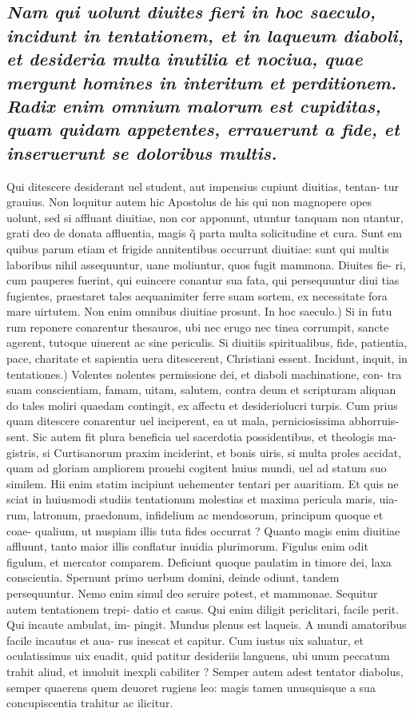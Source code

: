 \documentclass{article}
\begin{document}
\begin{pages}
\subsection*{\textit{Nam qui uolunt diuites fieri in hoc saeculo, incidunt in tentationem, et in laqueum diaboli, et desideria multa inutilia et nociua, quae mergunt homines in interitum et perditionem. Radix enim omnium malorum est cupiditas, quam quidam appetentes, errauerunt a fide, et inseruerunt se doloribus multis. }}\pstart Qui ditescere desiderant uel student, aut impensius cupiunt diuitias, tentan- tur grauius. Non loquitur autem hic Apostolus de his qui non magnopere opes uolunt, sed si affluant diuitiae, non cor apponunt, utuntur tanquam non utantur, grati deo de donata affluentia, magis q̃ parta multa solicitudine et cura. Sunt em quibus parum etiam et frigide annitentibus occurrunt diuitiae: sunt qui multis laboribus nihil assequuntur, uane moliuntur, quos fugit mammona. Diuites fie- ri, cum pauperes fuerint, qui euincere conantur sua fata, qui persequuntur diui tias fugientes, praestaret tales aequanimiter ferre suam sortem, ex necessitate fora mare uirtutem. Non enim omnibus diuitiae prosunt. In hoc saeculo.) Si in futu rum reponere conarentur thesauros, ubi nec erugo nec tinea corrumpit, sancte agerent, tutoque uiuerent ac sine periculis. Si diuitiis spiritualibus, fide, patientia, pace, charitate et sapientia uera ditescerent, Christiani essent. Incidunt, inquit, in tentationes.) Volentes nolentes permissione dei, et diaboli machinatione, con- tra suam conscientiam, famam, uitam, salutem, contra deum et scripturam aliquan do tales moliri quaedam contingit, ex affectu et desideriolucri turpis. Cum prius quam ditescere conarentur uel inciperent, ea ut mala, perniciosissima abhorruis- sent. Sic autem fit plura beneficia uel sacerdotia possidentibus, et theologis ma- gistris, si Curtisanorum praxim inciderint, et bonis uiris, si multa proles accidat, quam ad gloriam ampliorem prouehi cogitent huius mundi, uel ad statum suo similem. Hii enim statim incipiunt uehementer tentari per auaritiam. Et quis ne sciat in huiusmodi studiis tentationum molestias et maxima pericula maris, uia- rum, latronum, praedonum, infidelium ac mendosorum, principum quoque et coae- qualium, ut nuspiam illis tuta fides occurrat ? Quanto magis enim diuitiae affluunt, tanto maior illis conflatur inuidia plurimorum. Figulus enim odit figulum, et mercator comparem. Deficiunt quoque paulatim in timore dei, laxa conscientia. Spernunt primo uerbum domini, deinde odiunt, tandem persequuntur. Nemo enim simul deo seruire potest, et mammonae. Sequitur autem tentationem trepi- datio et casus. Qui enim diligit periclitari, facile perit. Qui incaute ambulat, im- pingit. Mundus plenus est laqueis. A mundi amatoribus facile incautus et aua- rus inescat et capitur. Cum iustus uix saluatur, et oculatissimus uix euadit, quid patitur desideriis languens, ubi unum peccatum trahit aliud, et inuoluit inexpli cabiliter ? Semper autem adest tentator diabolus, semper quaerens quem deuoret rugiens leo: magis tamen unusquisque a sua concupiscentia trahitur ac ilicitur.  \pend

\end{pages}
\end{document}
